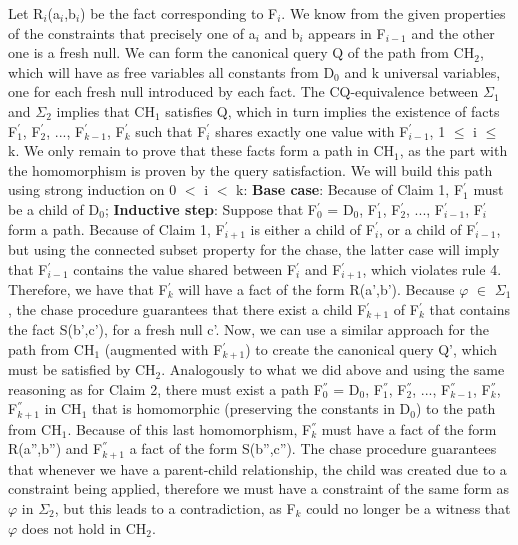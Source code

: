 \documentclass[11pt, a4paper, dvipsnames]{article}
\begin{document}
Let R$_{i}$(a$_{i}$,b$_{i}$) be the fact corresponding to F$_{i}$. We know from the given properties of the constraints that precisely one of a$_{i}$ and b$_{i}$ appears in F$_{i-1}$ and the other one is a fresh null. We can form the canonical query Q of the path from CH$_{2}$, which will have as free variables all constants from D$_{0}$ and k universal variables, one for each fresh null introduced by each fact. The CQ-equivalence between $\Sigma_{1}$ and $\Sigma_{2}$ implies that CH$_{1}$ satisfies Q, which in turn implies the existence of facts F$^{'}_{1}$, F$^{'}_{2}$, ..., F$^{'}_{k-1}$, F$^{'}_{k}$ such that F$^{'}_{i}$ shares exactly one value with F$^{'}_{i-1}$, 1 $\leq$ i $\leq$ k. We only remain to prove that these facts form a path in CH$_{1}$, as the part with the homomorphism is proven by the query satisfaction. We will build this path using strong induction on 0 $<$ i $<$ k:\newline
\textbf{Base case}: Because of Claim 1, F$^{'}_{1}$ must be a child of D$_{0}$;\newline
\textbf{Inductive step}: Suppose that F$^{'}_{0}$ = D$_{0}$, F$^{'}_{1}$, F$^{'}_{2}$, ..., F$^{'}_{i-1}$, F$^{'}_{i}$ form a path. Because of Claim 1, F$^{'}_{i+1}$ is either a child of F$^{'}_{i}$, or a child of F$^{'}_{i-1}$, but using the connected subset property for the chase, the latter case will imply that F$^{'}_{i-1}$ contains the value shared between F$^{'}_{i}$ and F$^{'}_{i+1}$, which violates rule 4.\newline
Therefore, we have that F$^{'}_{k}$ will have a fact of the form R(a',b'). Because $\varphi$ $\in$ $\Sigma_{1}$, the chase procedure guarantees that there exist a child F$^{'}_{k+1}$ of F$^{'}_{k}$ that contains the fact S(b',c'), for a fresh null c'.\newline
Now, we can use a similar approach for the path from CH$_{1}$ (augmented with F$^{'}_{k+1}$) to create the canonical query Q', which must be satisfied by CH$_{2}$. Analogously to what we did above and using the same reasoning as for Claim 2, there must exist a path F$^{''}_{0}$ = D$_{0}$, F$^{''}_{1}$, F$^{''}_{2}$, ..., F$^{''}_{k-1}$, F$^{''}_{k}$, F$^{''}_{k+1}$ in CH$_{1}$ that is homomorphic (preserving the constants in D$_{0}$) to the path from CH$_{1}$.\newline
Because of this last homomorphism, F$^{''}_{k}$ must have a fact of the form R(a'',b'') and F$^{''}_{k+1}$ a fact of the form S(b'',c''). The chase procedure guarantees that whenever we have a parent-child relationship, the child was created due to a constraint being applied, therefore we must have a constraint of the same form as $\varphi$ in $\Sigma_{2}$, but this leads to a contradiction, as F$_{k}$ could no longer be a witness that $\varphi$ does not hold in CH$_{2}$.\newline
\end{document}
